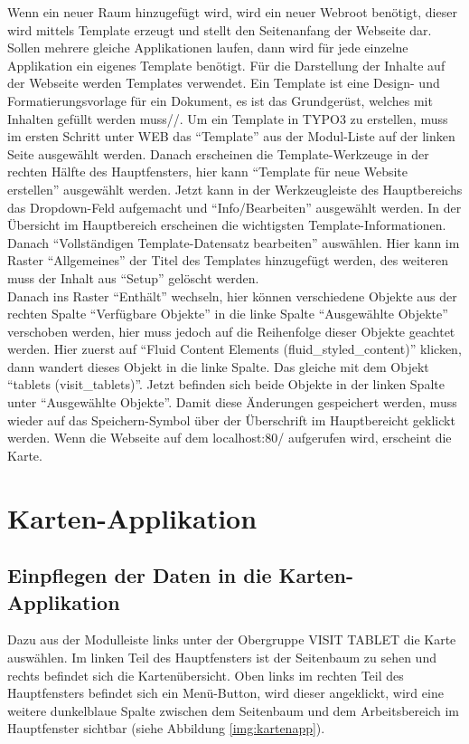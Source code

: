 Wenn ein neuer Raum hinzugefügt wird, wird ein neuer Webroot benötigt, dieser wird mittels Template erzeugt und stellt den Seitenanfang der Webseite dar. Sollen mehrere gleiche Applikationen laufen, dann wird für jede einzelne Applikation ein eigenes Template benötigt.
Für die Darstellung der Inhalte auf der Webseite werden Templates verwendet. Ein Template ist eine Design- und Formatierungsvorlage für ein Dokument, es ist das Grundgerüst, welches mit Inhalten gefüllt werden muss//.
Um ein Template in TYPO3 zu erstellen, muss im ersten Schritt unter WEB das “Template” aus der Modul-Liste auf der linken Seite ausgewählt werden. Danach erscheinen die Template-Werkzeuge in der rechten Hälfte des Hauptfensters, hier kann “Template für neue Website erstellen” ausgewählt werden. Jetzt kann in der Werkzeugleiste des Hauptbereichs das Dropdown-Feld aufgemacht und “Info/Bearbeiten” ausgewählt werden. In der Übersicht im Hauptbereich erscheinen die wichtigsten Template-Informationen. Danach “Vollständigen Template-Datensatz bearbeiten” auswählen. Hier kann im Raster “Allgemeines” der Titel des Templates hinzugefügt werden, des weiteren muss der Inhalt aus “Setup” gelöscht werden.\\
Danach ins Raster “Enthält” wechseln, hier können verschiedene Objekte aus der rechten Spalte “Verfügbare Objekte” in die linke Spalte “Ausgewählte Objekte” verschoben werden, hier muss jedoch auf die Reihenfolge dieser Objekte geachtet werden. Hier zuerst auf “Fluid Content Elements (fluid\_styled\_content)” klicken, dann wandert dieses Objekt in die linke Spalte. Das gleiche mit dem Objekt “tablets (visit\_tablets)”. Jetzt befinden sich beide Objekte in der linken Spalte unter “Ausgewählte Objekte”. Damit diese Änderungen gespeichert werden, muss wieder auf das Speichern-Symbol über der Überschrift im Hauptbereicht geklickt werden. Wenn die Webseite auf dem localhost:80/ aufgerufen wird, erscheint die Karte.


\section{Karten-Applikation}

\subsection{Einpflegen der Daten in die Karten-Applikation}

Dazu aus der Modulleiste links unter der Obergruppe VISIT TABLET die Karte auswählen. Im linken Teil des Hauptfensters ist der Seitenbaum zu sehen und rechts befindet sich die Kartenübersicht. Oben links im rechten Teil des Hauptfensters befindet sich ein Menü-Button, wird dieser angeklickt, wird eine weitere dunkelblaue Spalte zwischen dem Seitenbaum und dem Arbeitsbereich im Hauptfenster sichtbar (siehe Abbildung \ref{img:kartenapp}).

